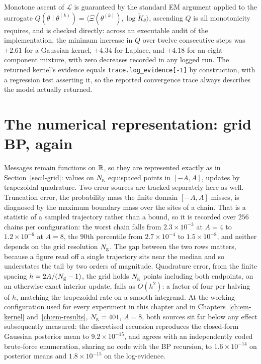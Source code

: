 Monotone ascent of $\mathcal L$ is guaranteed by the standard EM argument
applied to the surrogate $Q(\theta \mid \theta^{(k)}) = \langle
\Xi(\theta^{(k)}), \log \widetilde K_\theta\rangle$, ascending $Q$ is all
monotonicity requires, and is checked directly: across an executable audit
of the implementation, the minimum increase in $Q$ over twelve consecutive
steps was $+2.61$ for a Gaussian kernel, $+4.34$ for Laplace, and $+4.18$
for an eight-component mixture, with zero decreases recorded in any logged
run. The returned kernel's evidence equals
\texttt{trace.log\_evidence[-1]} by construction, with a regression test
asserting it, so the reported convergence trace always describes the model
actually returned.

\section{The numerical representation: grid BP, again}\label{sec:em-numerical}

Messages remain functions on $\mathbb{R}$, so they are represented exactly as in
Section~\ref{sec:l-grid}: values on $N_{\mathrm{g}}$ equispaced points in $[-A,A]$, updates
by trapezoidal quadrature. Two error sources are tracked separately here as
well. Truncation error, the probability mass the finite domain $[-A,A]$
misses, is diagnosed by the maximum boundary mass over the sites of a chain.
That is a statistic of a sampled trajectory rather than a bound, so it is
recorded over $256$ chains per configuration: the worst chain falls from
$2.3\times10^{-3}$ at $A=4$ to $1.2\times10^{-6}$ at $A=8$, the $90$th
percentile from $2.7\times10^{-4}$ to $1.5\times10^{-8}$, and neither depends on
the grid resolution $N_{\mathrm{g}}$. The gap between the two rows matters, because a figure
read off a single trajectory sits near the median and so understates the tail by
two orders of magnitude. Quadrature error, from the
finite spacing $h=2A/(N_{\mathrm{g}}-1)$, the grid holds $N_{\mathrm{g}}$ points including both
endpoints, on an otherwise exact interior update, falls as
$O(h^2)$: a factor of four per halving of $h$, matching the trapezoidal
rate on a smooth integrand. At the working configuration used for every
experiment in this chapter and in Chapters~\ref{ch:em-kernel}
and~\ref{ch:em-results}, $N_{\mathrm{g}}=401$, $A=8$, both sources sit far
below any effect subsequently measured: the discretised recursion reproduces
the closed-form Gaussian posterior mean to $9.2\times10^{-15}$, and agrees
with an independently coded brute-force enumeration, sharing no code with
the BP recursion, to $1.6\times10^{-14}$ on posterior means and
$1.8\times10^{-15}$ on the log-evidence.

